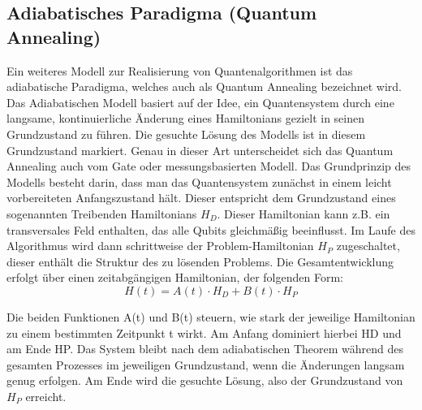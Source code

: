 \subsection{Adiabatisches Paradigma (Quantum Annealing)}
Ein weiteres Modell zur Realisierung von Quantenalgorithmen ist das adiabatische Paradigma, welches auch als Quantum Annealing bezeichnet wird. Das Adiabatischen Modell basiert auf der Idee, ein Quantensystem durch eine langsame, kontinuierliche Änderung eines Hamiltonians gezielt in seinen Grundzustand zu führen. Die gesuchte Lösung des Modells ist in diesem Grundzustand markiert. Genau in dieser Art unterscheidet sich das Quantum Annealing auch vom Gate oder messungsbasierten Modell. 
Das Grundprinzip des Modells besteht darin, dass man das Quantensystem zunächst in einem leicht vorbereiteten Anfangszustand hält. Dieser entspricht dem Grundzustand eines sogenannten Treibenden Hamiltonians $H_D$. Dieser Hamiltonian kann z.B. ein transversales Feld enthalten, das alle Qubits gleichmäßig beeinflusst. Im Laufe des Algorithmus wird dann schrittweise der Problem-Hamiltonian $H_P$ zugeschaltet, dieser enthält die Struktur des zu lösenden Problems. Die Gesamtentwicklung erfolgt über einen zeitabgängigen Hamiltonian, der folgenden Form:
$$
H(t) = A(t) \cdot H_D + B(t) \cdot H_P
$$

Die beiden Funktionen A(t) und B(t) steuern, wie stark der jeweilige Hamiltonian zu einem bestimmten Zeitpunkt t wirkt. Am Anfang dominiert hierbei HD und am Ende HP. Das System bleibt nach dem adiabatischen Theorem während des gesamten Prozesses im jeweiligen Grundzustand, wenn die Änderungen langsam genug erfolgen. Am Ende wird die gesuchte Lösung, also der Grundzustand von $H_P$ erreicht.
 
